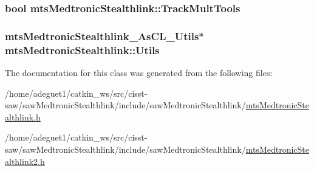 \hypertarget{classmts_medtronic_stealthlink_ac483f650c9ed1942194dbccca2c306d5}{
\subsubsection[{Track\-Mult\-Tools}]{\setlength{\rightskip}{0pt plus 5cm}bool mts\-Medtronic\-Stealthlink\-::\-Track\-Mult\-Tools\hspace{0.3cm}{\ttfamily [protected]}}}\label{classmts_medtronic_stealthlink_ac483f650c9ed1942194dbccca2c306d5}
\hypertarget{classmts_medtronic_stealthlink_ab6970edff3db4896a9cce824323f3c3e}{
\subsubsection[{Utils}]{\setlength{\rightskip}{0pt plus 5cm}mts\-Medtronic\-Stealthlink\-\_\-\-As\-C\-L\-\_\-\-Utils$\ast$ mts\-Medtronic\-Stealthlink\-::\-Utils\hspace{0.3cm}{\ttfamily [protected]}}}\label{classmts_medtronic_stealthlink_ab6970edff3db4896a9cce824323f3c3e}


The documentation for this class was generated from the following files\-:\begin{DoxyCompactItemize}
\item 
/home/adeguet1/catkin\-\_\-ws/src/cisst-\/saw/saw\-Medtronic\-Stealthlink/include/saw\-Medtronic\-Stealthlink/\hyperlink{mts_medtronic_stealthlink_8h}{mts\-Medtronic\-Stealthlink.\-h}\item 
/home/adeguet1/catkin\-\_\-ws/src/cisst-\/saw/saw\-Medtronic\-Stealthlink/include/saw\-Medtronic\-Stealthlink/\hyperlink{mts_medtronic_stealthlink2_8h}{mts\-Medtronic\-Stealthlink2.\-h}\end{DoxyCompactItemize}
